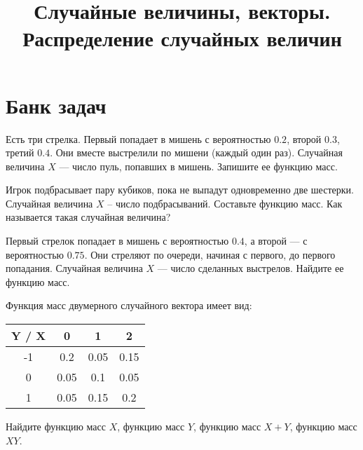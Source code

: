 

\title{Случайные величины, векторы. Распределение случайных величин}
\date{\vspace{-1cm}}


\maketitle

\section*{Банк задач}
\begin{problem}
    Есть три стрелка.
    Первый попадает в мишень с вероятностью $0.2$, второй $0.3$, третий $0.4$.
    Они вместе выстрелили по мишени (каждый один раз).
    Случайная величина $X$ — число пуль, попавших в мишень.
    Запишите ее функцию масс.
\end{problem}

\begin{problem}
    Игрок подбрасывает пару кубиков, пока не выпадут одновременно две шестерки.
    Случайная величина $X$ -- число подбрасываний.
    Составьте функцию масс.
    Как называется такая случайная величина?
\end{problem}

\begin{problem}
    Первый стрелок попадает в мишень с вероятностью $0.4$, а второй — с вероятностью $0.75$.
    Они стреляют по очереди, начиная с первого, до первого попадания.
    Случайная величина $X$ — число сделанных выстрелов.
    Найдите ее функцию масс.
\end{problem}

\begin{problem}
    Функция масс двумерного случайного вектора имеет вид:
    \begin{center}
    \begin{tabular}{c|c|c|c}
        Y / X & 0 & 1 & 2 \\
        \hline
        -1 & 0.2 & 0.05 & 0.15 \\
        \hline
        0 & 0.05 & 0.1 & 0.05 \\
        \hline
        1 & 0.05 & 0.15 & 0.2 \\
    \end{tabular}
    \end{center}
    Найдите функцию масс $X$, функцию масс $Y$, функцию масс $X + Y$, функцию масс $XY$.
\end{problem}

